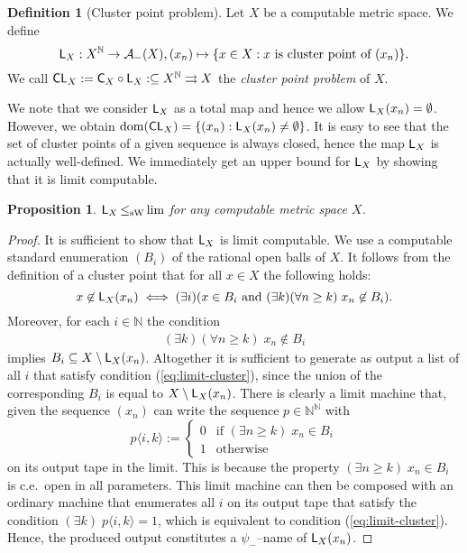 \documentclass[a4paper]{amsart}
\def\AA{{\mathcal A}}
\def\IN{{\mathbb{N}}}
\def\In{\subseteq}
\def\mto{\rightrightarrows}
\def\dom{{\rm dom}}
\def\C{\mbox{\rm\sffamily C}}
\def\L{\text{\rm\sffamily L}}
\def\CL{\text{\rm\sffamily CL}}
\def\leqSW{\mathop{\leq_{\mathrm{sW}}}}
\newtheorem{proposition}[theorem]{Proposition}
\theoremstyle{definition}
\newtheorem{definition}[theorem]{Definition}
\begin{document}
\begin{definition}[Cluster point problem]
Let $X$ be a computable metric space. We define
\[\L_X:X^\IN\to\AA_-(X),(x_n)\mapsto\{x\in X:\mbox{$x$ is cluster point of $(x_n)$}\}.\]
We call $\CL_X:=\C_X\circ\L_X:\In X^\IN\mto X$ the {\em cluster point problem} of $X$.
\end{definition}

We note that we consider $\L_X$ as a total map and hence we allow $\L_X(x_n)=\emptyset$.
However, we obtain $\dom(\CL_X)=\{(x_n):\L_X(x_n)\not=\emptyset\}$.
It is easy to see that the set of cluster points of a given sequence is always closed, hence
the map $\L_X$ is actually well-defined. 
We immediately get an upper bound for $\L_X$ by showing that it is limit computable. 

\begin{proposition} 
\label{prop:limit-cluster}
$\L_X\leqSW\lim$ for any computable metric space $X$.
\end{proposition}
\begin{proof}
It is sufficient to show that $\L_X$ is limit computable.
We use a computable standard enumeration $(B_i)$ of the rational open 
balls of $X$. 
It follows from the definition of a cluster point that for all $x\in X$ the following holds:
\[x\not\in\L_X(x_n)\iff(\exists i)(x\in B_i\mbox{ and }(\exists k)(\forall n\geq k)\;x_n\not\in B_i).\]
Moreover, for each $i\in\IN$ the condition
\begin{eqnarray}
(\exists k)(\forall n\geq k)\;x_n\not\in B_i
\label{eq:limit-cluster}
\end{eqnarray}
implies $B_i\In X\setminus\L_X(x_n)$.
Altogether it is sufficient to generate as output a list of all $i$ that satisfy condition (\ref{eq:limit-cluster}),
since the union of the corresponding $B_i$ is equal to $X\setminus\L_X(x_n)$. 
There is clearly a limit machine that, given the sequence $(x_n)$ can
write the sequence $p\in\IN^\IN$ with
\[p\langle i,k\rangle:=\left\{\begin{array}{ll} 
   0 & \mbox{if $(\exists n\geq k)\;x_n\in B_i$}\\
   1 & \mbox{otherwise}
\end{array}\right.\]
on its output tape in the limit. This is because the property $(\exists n\geq k)\;x_n\in B_i$ is c.e.\ open
in all parameters. This limit machine can then be composed with an ordinary machine
that enumerates all $i$ on its output tape that satisfy the condition $ (\exists k)\;p\langle i,k\rangle=1$,
which is equivalent to condition (\ref{eq:limit-cluster}).
Hence, the produced output constitutes a $\psi_-$--name of $\L_X(x_n)$.
\end{proof}
\end{document}
